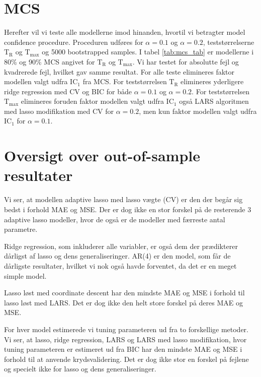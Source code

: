 \section{MCS} 
Herefter vil vi teste alle modellerne imod hinanden, hvortil vi betragter model confidence procedure.
Proceduren udføres for \(\alpha = 0.1\) og \(\alpha = 0.2\), teststørrelserne \(\text{T}_\text{R}\) og \(\text{T}_\text{max}\) og 5000 bootstrapped samples.
I tabel \ref{tab:mcs_tab} er modellerne i 80\% og 90\% MCS angivet for \(\text{T}_\text{R}\) og \(\text{T}_\text{max}\).
Vi har testet for absolutte fejl og kvadrerede fejl, hvilket gav samme resultat.
For alle teste elimineres faktor modellen valgt udfra IC\(_1\) fra MCS.
For teststørrelsen \(\text{T}_\text{R}\) elimineres yderligere ridge regression med CV og BIC for både \(\alpha = 0.1\) og \(\alpha = 0.2\).
For teststørrelsen \(\text{T}_\text{max}\) elimineres foruden faktor modellen valgt udfra IC\(_1\) også LARS algoritmen med lasso modifikation med CV for \(\alpha = 0.2\), men kun faktor modellen valgt udfra IC\(_1\) for \(\alpha = 0.1\).
%

%

\section{Oversigt over out-of-sample resultater}
Vi ser, at modellen adaptive lasso med lasso vægte (CV) er den der begår sig bedst i forhold MAE og MSE. 
Der er dog ikke en stor forskel på de resterende 3 adaptive lasso modeller, hvor de også er de modeller med færreste antal parametre. 

Ridge regression, som inkluderer alle variabler, er også dem der prædikterer dårligst af lasso og dens generaliseringer. 
AR(4) er den model, som får de dårligste resultater, hvilket vi nok også havde forventet, da det er en meget simple model. 

Lasso løst med coordinate descent har den mindste MAE og MSE i forhold til lasso løst med LARS. Det er dog ikke den helt store forskel på deres MAE og MSE. 

For hver model estimerede vi tuning parameteren ud fra to forskellige metoder. Vi ser, at lasso, ridge regression, LARS og LARS med lasso modifikation, hvor tuning parameteren er estimeret ud fra BIC har den mindste MAE og MSE i forhold til at anvende krydsvalidering. Det er dog ikke stor en forskel på fejlene og specielt ikke for lasso og dens generaliseringer. 

%
%


